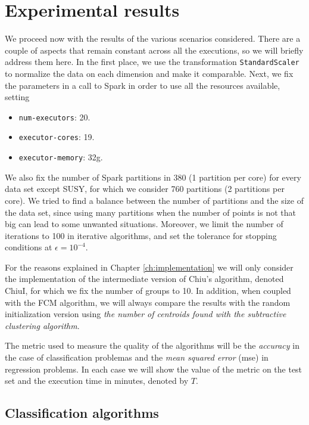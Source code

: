 \section{Experimental results}

We proceed now with the results of the various scenarios considered. There are a couple of aspects that remain constant across all the executions, so we will briefly address them here. In the first place, we use the transformation \verb|StandardScaler| to normalize the data on each dimension and make it comparable. Next, we fix the parameters in a call to Spark in order to use all the resources available, setting

\begin{itemize}
  \item \verb|num-executors|: 20.
  \item \verb|executor-cores|: 19.
  \item \verb|executor-memory|: 32g.
\end{itemize}
We also fix the number of Spark partitions in 380 (1 partition per core) for every data set except SUSY, for which we consider 760 partitions (2 partitions per core). We tried to find a balance between the number of partitions and the size of the data set, since using many partitions when the number of points is not that big can lead to some unwanted situations. Moreover, we limit the number of iterations to 100 in iterative algorithms, and set the tolerance for stopping conditions at $\epsilon=10^{-4}$.

For the reasons explained in Chapter \ref{ch:implementation} we will only consider the implementation of the intermediate version of Chiu's algorithm, denoted ChiuI, for which we fix the number of groups to 10. In addition, when coupled with the FCM algorithm, we will always compare the results with the random initialization version using \textit{the number of centroids found with the subtractive clustering algorithm}.

The metric used to measure the quality of the algorithms will be the \textit{accuracy} in the case of classification problemas and the \textit{mean squared error} (\acrshort{mse}) in regression problems. In each case we will show the value of the metric on the test set and the execution time in minutes, denoted by $T$.

\subsection{Classification algorithms}

